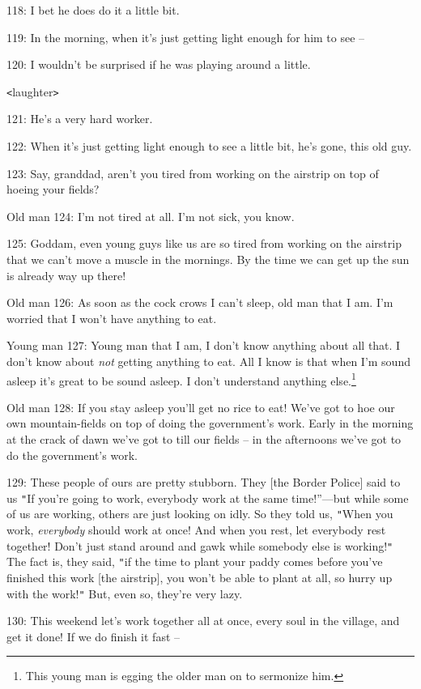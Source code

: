 118: I bet he does do it a little bit.

119: In the morning, when it's just getting light enough for him to see --

120: I wouldn't be surprised if he was playing around a little.

\texttt{<}laughter\texttt{>}

121: He's a very hard worker.

122: When it's just getting light enough to see a little bit, he's gone, this old
guy.

123: Say, granddad, aren't you tired from working on the airstrip on top of hoeing
your fields?

Old man 124: I'm not tired at all. I'm not sick, you know.

125: Goddam, even young guys like us are so tired from working on the airstrip
that we can't move a muscle in the mornings. By the time we can get up the sun
is already way up there!

Old man 126: As soon as the cock crows I can't sleep, old man that I am. I'm worried
that I won't have anything to eat.

Young man 127: Young man that I am, I don't know anything about all that. I don't
know about \textit{not} getting anything to eat. All I know is that when I'm sound
asleep it's great to be sound asleep. I don't understand anything else.\footnote{This young man is egging the older man on to sermonize him.}

Old man 128: If you stay asleep you'll get no rice to eat! We've got to hoe our
own mountain-fields on top of doing the government's work. Early in the morning
at the crack of dawn we've got to till our fields -- in the afternoons we've got
to do the government's work.

129: These people of ours are pretty stubborn. They [the Border Police] said to
us \texttt{"}If you're going to work, everybody work at the same time!''---but
while some of us are working, others are just looking on idly. So they told us,
\texttt{"}When you work, \textit{everybody} should work at once! And when you rest,
let everybody rest together! Don't just stand around and gawk while somebody else
is working!\texttt{"} The fact is, they said, \texttt{"}if the time to plant your
paddy comes before you've finished this work [the airstrip], you won't be able
to plant at all, so hurry up with the work!\texttt{"} But, even so, they're very
lazy.

130: This weekend let's work together all at once, every soul in the village, and
get it done! If we do finish it fast --

